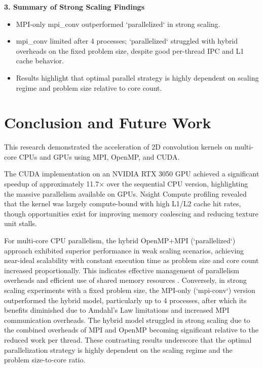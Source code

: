 \documentclass[conference, 10pt]{IEEEtran}
\begin{document}
\textbf{3. Summary of Strong Scaling Findings}
\begin{itemize}
    \item MPI-only mpi\_conv outperformed `parallelized` in strong scaling.
    \item mpi\_conv limited after 4 processes; `parallelized` struggled with hybrid overheads on the fixed problem size, despite good per-thread IPC and L1 cache behavior.
    \item Results highlight that optimal parallel strategy is highly dependent on scaling regime and problem size relative to core count.
\end{itemize}




\section{Conclusion and Future Work}

This research demonstrated the acceleration of 2D convolution kernels on multi-core CPUs and GPUs using MPI, OpenMP, and CUDA.

The CUDA implementation on an NVIDIA RTX 3050 GPU achieved a significant speedup of approximately 11.7$\times$ over the sequential CPU version, highlighting the massive parallelism available on GPUs. Nsight Compute profiling revealed that the kernel was largely compute-bound with high L1/L2 cache hit rates, though opportunities exist for improving memory coalescing and reducing texture unit stalls.

For multi-core CPU parallelism, the hybrid OpenMP+MPI (`parallelized`) approach exhibited superior performance in weak scaling scenarios, achieving near-ideal scalability with constant execution time as problem size and core count increased proportionally. This indicates effective management of parallelism overheads and efficient use of shared memory resources \cite{Gawrych2023}. Conversely, in strong scaling experiments with a fixed problem size, the MPI-only (`mpi-conv`) version outperformed the hybrid model, particularly up to 4 processes, after which its benefits diminished due to Amdahl's Law limitations \cite{hager2021hpc} and increased MPI communication overheads. The hybrid model struggled in strong scaling due to the combined overheads of MPI and OpenMP becoming significant relative to the reduced work per thread. These contrasting results underscore that the optimal parallelization strategy is highly dependent on the scaling regime and the problem size-to-core ratio.
\end{document}
